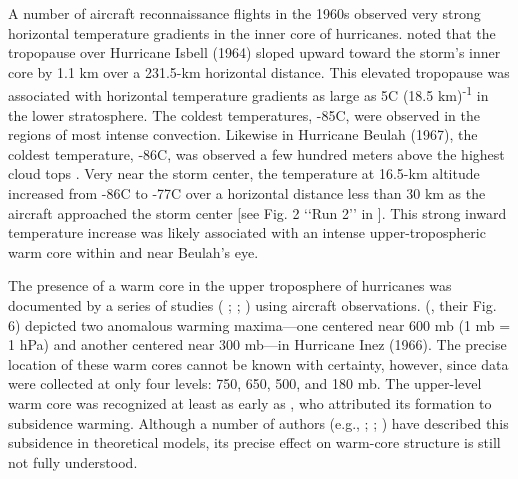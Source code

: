 A number of aircraft reconnaissance flights in the 1960s observed very strong horizontal temperature gradients in the inner core of hurricanes.
\cite{Penn1966} noted that the tropopause over Hurricane Isbell (1964) sloped upward toward the storm’s inner core by 1.1 km over a 231.5-km horizontal distance.
This elevated tropopause was associated with horizontal temperature gradients as large as 5\textdegree{}C (18.5 km)\textsuperscript{-1} in the lower stratosphere.
The coldest temperatures, -85\textdegree{}C, were observed in the regions of most intense convection.
Likewise in Hurricane Beulah (1967), the coldest temperature, -86\textdegree{}C, was observed a few hundred meters above the highest cloud tops \citep{Waco1970}.
Very near the storm center, the temperature at 16.5-km altitude increased from -86\textdegree{}C to -77\textdegree{}C over a horizontal distance less than 30 km as the aircraft approached the storm center [see Fig. 2 ‘‘Run 2’’ in \cite{Waco1970}].
This strong inward temperature increase was likely associated with an intense upper-tropospheric warm core within and near Beulah’s eye.

The presence of a warm core in the upper troposphere of hurricanes was documented by a series of studies (\citeauthor{LaSeurHawkins1963} \citeyear{LaSeurandHawkins1963}; \citeauthor{HawkinsRubsam1968} \citeyear{HawkinsRubsam1968}; \citeauthor{HawkinsImbembo1976} \citeyear{HawkinsImbembo1976}) using aircraft observations.
\citeauthor{HawkinsImbembo1976} (\citeyear{HawkinsImbembo1976}, their Fig. 6) depicted two anomalous warming maxima---one centered near 600 mb (1 mb = 1 hPa) and another centered near 300 mb---in Hurricane Inez (1966).
The precise location of these warm cores cannot be known with certainty, however, since data were collected at only four levels: 750, 650, 500, and 180 mb.
The upper-level warm core was recognized at least as early as \cite{Haurwitz1935}, who attributed its formation to subsidence warming.
Although a number of authors (e.g., \citeauthor{Malkus1958} \citeyear{Malkus1958}; \citeauthor{Willoughby1979} \citeyear{Willoughby1979}; \citeauthor{Smith1980} \citeyear{Smith1980}) have described this subsidence in theoretical models, its precise effect on warm-core structure is still not fully understood.

